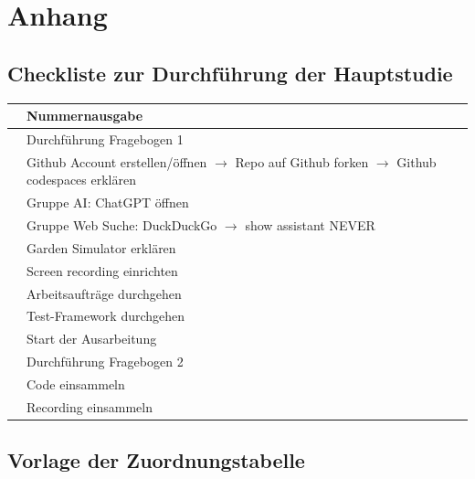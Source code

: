 
\appendix
\renewcommand{\thechapter}{\Alph{chapter}}
\renewcommand{\thesection}{\Alph{section}}

{}
\chapter*{Anhang}

\section{Checkliste zur Durchführung der Hauptstudie}
\label{app:checkliste-hauptstudie}

\begingroup
\renewcommand{\arraystretch}{1.5}
\noindent
\begin{tabularx}{\textwidth}{|p{0.6cm}|Y|}
\hline
 & Nummernausgabe \\ \hline
 & Durchführung Fragebogen 1 \\ \hline
 & Github Account erstellen/öffnen $\rightarrow$ Repo auf Github forken
   $\rightarrow$ Github codespaces erklären \\ \hline
 & Gruppe AI: ChatGPT öffnen \\ \hline
 & Gruppe Web Suche: DuckDuckGo $\rightarrow$ show assistant NEVER \\ \hline
 & Garden Simulator erklären \\ \hline
 & Screen recording einrichten \\ \hline
 & Arbeitsaufträge durchgehen \\ \hline
 & Test-Framework durchgehen \\ \hline
 & Start der Ausarbeitung \\ \hline
 & Durchführung Fragebogen 2 \\ \hline
 & Code einsammeln \\ \hline
 & Recording einsammeln \\ \hline
\end{tabularx}
\endgroup

\clearpage
\section{Vorlage der Zuordnungstabelle}
\label{app:zuordnungstabelle}

